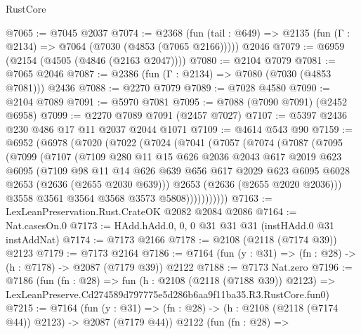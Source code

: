 \begin{lexlean}{RustCore}
\begin{coremodule}
@7065 := @7045 @2037
@7074 := @2368
    (fun (tail : @649) => @2135 (fun (Γ : @2134) => @7064 (@7030 (@4853 (@7065 @2166)))))
    @2046
@7079 := @6959 (@2154 (@4505 (@4846 (@2163 @2047))))
@7080 := @2104 @7079
@7081 := @7065 @2046
@7087 := @2386 (fun (Γ : @2134) => @7080 (@7030 (@4853 @7081))) @2436
@7088 := @2270 @7079
@7089 := @7028 @4580
@7090 := @2104 @7089
@7091 := @5970 @7081
@7095 := @7088 (@7090 @7091) (@2452 @6958)
@7099 := @2270 @7089 @7091 (@2457 @7027)
@7107 := @5397 @2436 @230 @486 @17 @11 @2037 @2044 @1071
@7109 := @4614 @543 @90
@7159 := @6952
    (@6978
      (@7020
        (@7022
          (@7024
            (@7041
              (@7057
                (@7074
                  (@7087
                    (@7095
                      (@7099
                        (@7107
                          (@7109
                            @280
                            @11
                            @15
                            @626
                            @2036
                            @2043
                            @617
                            @2019
                            @623
                            @6095
                            (@7109
                              @98
                              @11
                              @14
                              @626
                              @639
                              @656
                              @617
                              @2029
                              @623
                              @6095
                              @6028
                              @2653
                              (@2636 (@2655 @2030 @639)))
                            @2653
                            (@2636 (@2655 @2020 @2036)))
                          @3558
                          @3561
                          @3564
                          @3568
                          @3573
                          @5808)))))))))))
@7163 := LexLeanPreservation.Rust.CrateOK @2082 @2084 @2086
@7164 := Nat.casesOn.{0}
@7173 := HAdd.hAdd.{0, 0, 0} @31 @31 @31 (instHAdd.{0} @31 instAddNat)
@7174 := @7173 @2166
@7178 := @2108 (@2118 (@7174 @39)) @2123
@7179 := @7173 @2164
@7186 := @7164 (fun (y : @31) => (fn : @28) -> (h : @7178) -> @2087 (@7179 @39)) @2122
@7188 := @7173 Nat.zero
@7196 := @7186
    (fun (fn : @28) =>
    fun (h : @2108 (@2118 (@7188 @39)) @2123) =>
    LexLeanPreserve.Cd274589d797775e5d286b6aa9f11ba35.R3.RustCore.fun0)
@7215 := @7164
    (fun (y : @31) => (fn : @28) -> (h : @2108 (@2118 (@7174 @44)) @2123) -> @2087 (@7179 @44))
    @2122
    (fun (fn : @28) =>

\end{coremodule}
\end{lexlean}
